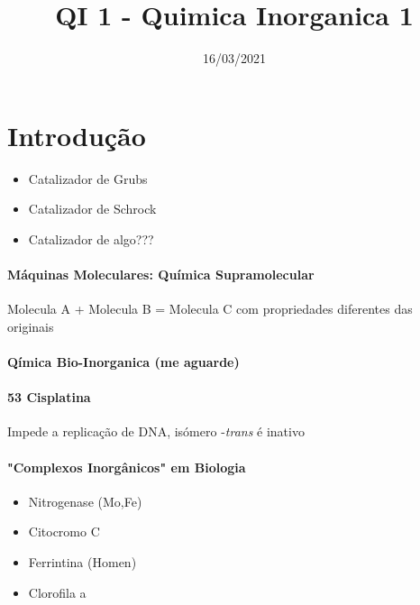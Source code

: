 \documentclass[12pt]{report}
\begin{document}
\title{QI 1 - Quimica Inorganica 1}
\author{}
\date{16/03/2021}

\maketitle

\tableofcontents

\newpage

\section{Introdução}

\begin{itemize}
\item Catalizador de Grubs
\item Catalizador de Schrock
\item Catalizador de algo???
\end{itemize}


\paragraph{Máquinas Moleculares: Química Supramolecular\\ }
Molecula A + Molecula B = Molecula C com propriedades diferentes das originais

\paragraph{Qímica Bio-Inorganica (me aguarde)\\ }

\paragraph{53 Cisplatina\\ }
Impede a replicação de DNA, isómero -\textit{trans} é inativo

\paragraph{"Complexos Inorgânicos" em Biologia\\ }
\begin{itemize}
\item Nitrogenase (Mo,Fe)
\item Citocromo C
\item Ferrintina (Homen)
\item Clorofila a
\end{itemize}
\end{document}
